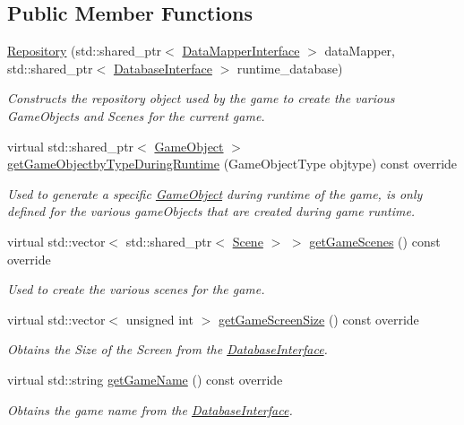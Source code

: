 \subsection*{Public Member Functions}
\begin{DoxyCompactItemize}
\item 
\hyperlink{class_repository_a0464c81256d66e31e9d5849d3ae0dfb2}{Repository} (std\+::shared\+\_\+ptr$<$ \hyperlink{class_data_mapper_interface}{Data\+Mapper\+Interface} $>$ data\+Mapper, std\+::shared\+\_\+ptr$<$ \hyperlink{class_database_interface}{Database\+Interface} $>$ runtime\+\_\+database)
\begin{DoxyCompactList}\small\item\em Constructs the repository object used by the game to create the various Game\+Objects and Scenes for the current game. \end{DoxyCompactList}\item 
virtual std\+::shared\+\_\+ptr$<$ \hyperlink{class_game_object}{Game\+Object} $>$ \hyperlink{class_repository_ab239e9b04db0524e168d54201bcd7076}{get\+Game\+Objectby\+Type\+During\+Runtime} (Game\+Object\+Type objtype) const override
\begin{DoxyCompactList}\small\item\em Used to generate a specific \hyperlink{class_game_object}{Game\+Object} during runtime of the game, is only defined for the various game\+Objects that are created during game runtime. \end{DoxyCompactList}\item 
virtual std\+::vector$<$ std\+::shared\+\_\+ptr$<$ \hyperlink{class_scene}{Scene} $>$ $>$ \hyperlink{class_repository_ad49505f4ec3a15d0812ede7ff82b8be2}{get\+Game\+Scenes} () const override
\begin{DoxyCompactList}\small\item\em Used to create the various scenes for the game. \end{DoxyCompactList}\item 
virtual std\+::vector$<$ unsigned int $>$ \hyperlink{class_repository_ab369b3a1d2957b2bd3130c8c348343dd}{get\+Game\+Screen\+Size} () const override
\begin{DoxyCompactList}\small\item\em Obtains the Size of the Screen from the \hyperlink{class_database_interface}{Database\+Interface}. \end{DoxyCompactList}\item 
virtual std\+::string \hyperlink{class_repository_a9bdfb4cab4ece2af1e45ef5ef06b9e49}{get\+Game\+Name} () const override
\begin{DoxyCompactList}\small\item\em Obtains the game name from the \hyperlink{class_database_interface}{Database\+Interface}. \end{DoxyCompactList}\end{DoxyCompactItemize}
